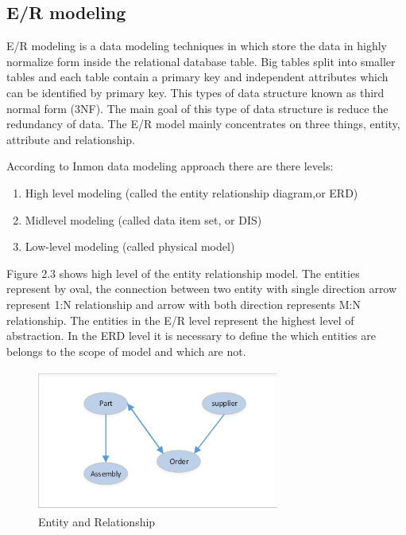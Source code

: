 \subsection{E/R modeling}
E/R modeling  is a data modeling techniques in which store the data  in highly  
normalize form inside the relational database table. Big tables split into smaller tables and each table contain a primary key and independent attributes which can be identified by primary key. This types of data structure known as third normal form (3NF). The main goal of this type of  data structure is reduce the redundancy of data. The E/R model mainly concentrates on three things, entity, attribute and relationship.

According to Inmon data modeling approach there are there levels:
\begin{enumerate}
\item High level modeling (called the entity relationship diagram,or ERD)
\item Midlevel modeling (called data item set, or DIS)
\item Low-level modeling (called physical model) 
\end{enumerate}

Figure 2.3 shows high level of the entity relationship model. The entities represent by oval, the connection between two entity with single direction arrow represent 1:N relationship and arrow with both direction represents M:N relationship. The entities in the E/R level represent the  highest level of abstraction. In the ERD level it is necessary to define the which entities are belongs to the scope of model and which are not.
\begin{figure}[!ht]
	\centering
		\includegraphics[width=226pt, height=132pt, width=1.0\textwidth]{images/inmon1.pdf}
	\caption[Entity and Relationship]{Entity and Relationship\footnotemark} 
	\label{fig:Inmon}

\end{figure}

